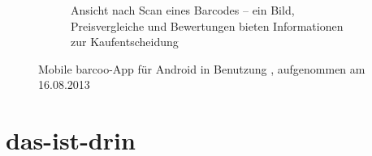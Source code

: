 \begin{figure}[ht]
\begin{subfigure}[b]{0.45\textwidth}
		\caption{Ansicht nach Scan eines Barcodes -- ein Bild,
		Preisvergleiche und Bewertungen bieten Informationen zur
Kaufentscheidung}
		\label{img:barcoo-2}
	\end{subfigure}
	\caption[Mobile barcoo-App für Android in Benutzung]{Mobile barcoo-App für Android in
	Benutzung , aufgenommen am 16.08.2013}
	\label{img:barcoo}
\end{figure}

\section{das-ist-drin}
\label{sec:did}

